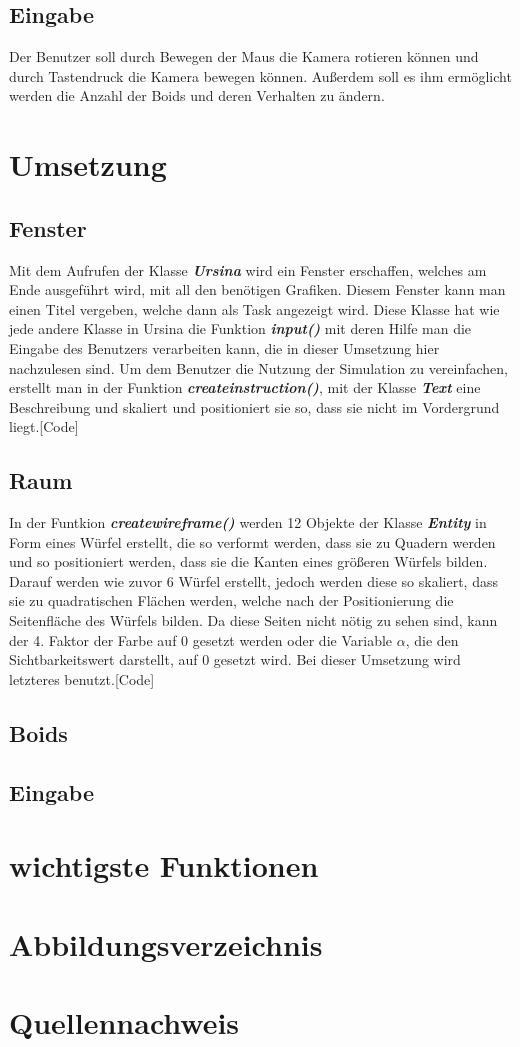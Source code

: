 \documentclass[a4paper, 12pt]{article}
\begin{document}
	\subsection{Eingabe}
	Der Benutzer soll durch Bewegen der Maus die Kamera rotieren können und durch Tastendruck die Kamera bewegen können. Außerdem soll es ihm ermöglicht werden die Anzahl der Boids und deren Verhalten zu ändern.
	\newpage
	
	
	
	\section{Umsetzung}
	\subsection{Fenster}
	Mit dem Aufrufen der Klasse \textbf{\emph{Ursina}} wird ein Fenster erschaffen, welches am Ende ausgeführt wird, mit all den benötigen Grafiken. Diesem Fenster kann man einen Titel vergeben, welche dann als Task angezeigt wird. Diese Klasse hat wie jede andere Klasse in Ursina die Funktion \textbf{\emph{input()}} mit deren Hilfe man die Eingabe des Benutzers verarbeiten kann, die in dieser Umsetzung hier nachzulesen sind. Um dem Benutzer die Nutzung der Simulation zu vereinfachen, erstellt man in der Funktion \textbf{\emph{createinstruction()}}, mit der Klasse \textbf{\emph{Text}} eine Beschreibung und skaliert und positioniert sie so, dass sie nicht im Vordergrund liegt.[Code]
	\subsection{Raum}
	In der Funtkion \textbf{\emph{createwireframe()}} werden 12 Objekte der Klasse \emph{\textbf{Entity}} in Form eines Würfel erstellt, die so verformt werden, dass sie zu Quadern werden und so positioniert werden, dass sie die Kanten eines größeren Würfels bilden. Darauf werden wie zuvor 6 Würfel erstellt, jedoch werden diese so skaliert, dass sie zu quadratischen Flächen werden, welche nach der Positionierung die Seitenfläche des Würfels bilden. Da diese Seiten nicht nötig zu sehen sind, kann der 4. Faktor der Farbe auf 0 gesetzt werden oder die Variable $\alpha$, die den Sichtbarkeitswert darstellt, auf 0 gesetzt wird. Bei dieser Umsetzung wird letzteres benutzt.[Code]
	
	\subsection{Boids}
	
	\subsection{Eingabe}
	\newpage
	\section{wichtigste Funktionen}
	\newpage
	\section{Abbildungsverzeichnis}
	\newpage
	\section{Quellennachweis}
	\newpage
\end{document}
